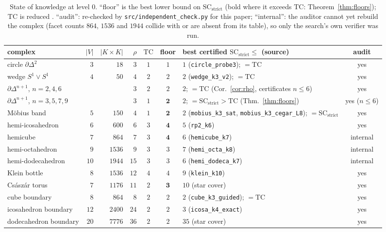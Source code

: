\documentclass[12pt]{article}
\newcommand{\TC}{\mathrm{TC}}
\newcommand{\SC}{\mathrm{SC}}
\newcommand{\SCst}{\SC_{\mathrm{strict}}}
\begin{document}
\begin{table}[H]
\centering\footnotesize
\setlength{\tabcolsep}{3pt}
\begin{tabular}{@{}lrrrcc>{\raggedright\arraybackslash}p{4.6cm}c@{}}
\toprule
complex & $|V|$ & $|K{\times}K|$ & $\rho$ & $\TC$ & floor & best certified $\SCst\le$ (source) & audit \\
\midrule
circle $\partial\Delta^2$ & $3$ & $18$ & $3$ & $1$ & $1$ & $1$ (\texttt{circle\_probe3}); $=\TC$ & yes\\
wedge $S^1\vee S^1$ & $4$ & $50$ & $4$ & $2$ & $2$ & $2$ (\texttt{wedge\_k3\_v2}); $=\TC$ & yes\\
$\partial\Delta^{n+1}$, $n=2,4,6$ & & & $3$ & $2$ & $2$ & $2$; $=\TC$ (Cor.~\ref{cor:rho}, certificates $n\le6$) & yes\\
$\partial\Delta^{n+1}$, $n=3,5,7,9$ & & & $3$ & $1$ & $\mathbf 2$ & $2$; $=\SCst>\TC$ (Thm.~\ref{thm:floors}) & yes ($n\le6$)\\
M\"obius band & $5$ & $150$ & $4$ & $1$ & $\mathbf 2$ & $2$ (\texttt{mobius\_k3\_sat}, \texttt{mobius\_k3\_cegar\_L8}); $=\SCst$ & yes\\
hemi-icosahedron & $6$ & $600$ & $6$ & $3$ & $\mathbf 4$ & $5$ (\texttt{rp2\_k6}) & yes\\
hemicube & $7$ & $864$ & $7$ & $3$ & $\mathbf 4$ & $6$ (\texttt{hemicube\_k7}) & internal\\
hemi-octahedron & $9$ & $1536$ & $9$ & $3$ & $3$ & $7$ (\texttt{hemi\_octa\_k8}) & internal\\
hemi-dodecahedron & $10$ & $1944$ & $15$ & $3$ & $3$ & $6$ (\texttt{hemi\_dodeca\_k7}) & internal\\
Klein bottle & $8$ & $1536$ & $12$ & $4$ & $4$ & $9$ (\texttt{klein\_k10}) & yes\\
Cs\'asz\'ar torus & $7$ & $1176$ & $11$ & $2$ & $\mathbf 3$ & $10$ (star cover) & yes\\
cube boundary & $8$ & $864$ & $8$ & $2$ & $2$ & $2$ (\texttt{cube\_k3\_guided}); $=\TC$ & yes\\
icosahedron boundary & $12$ & $2400$ & $24$ & $2$ & $2$ & $3$ (\texttt{icosa\_k4\_exact}) & yes\\
dodecahedron boundary & $20$ & $7776$ & $36$ & $2$ & $2$ & $35$ (star cover) & yes\\
\bottomrule
\end{tabular}
\caption{State of knowledge at level $0$.  ``floor'' is the best lower
bound on $\SCst$ (bold where it exceeds $\TC$: Theorem~\ref{thm:floors});
$\TC$ is reduced \cite{F03,FTY03,CV17}.  ``audit'': re-checked by
\texttt{src/independent\_check.py} for this paper; ``internal'': the auditor
cannot yet rebuild the complex (facet counts $864$, $1536$ and $1944$
collide with or are absent from its table), so only the search's own
verifier was run.}
\label{tab:surfaces}
\end{table}
\end{document}

